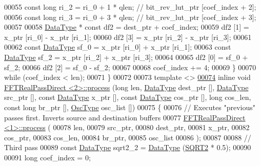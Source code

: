 \begin{DoxyCode}
00055         \textcolor{keyword}{const} \textcolor{keywordtype}{long}      ri\_2 = ri\_0 + 1 * qlen; \textcolor{comment}{// bit\_rev\_lut\_ptr [coef\_index + 2];}
00056         \textcolor{keyword}{const} \textcolor{keywordtype}{long}      ri\_3 = ri\_0 + 3 * qlen; \textcolor{comment}{// bit\_rev\_lut\_ptr [coef\_index + 3];}
00057 
00058         \hyperlink{a00013_a831663a8e0b1414e80f82cd3d18b5b6b}{DataType}    * \textcolor{keyword}{const} df2 = dest\_ptr + coef\_index;
00059         df2 [1] = x\_ptr [ri\_0] - x\_ptr [ri\_1];
00060         df2 [3] = x\_ptr [ri\_2] - x\_ptr [ri\_3];
00061 
00062         \textcolor{keyword}{const} \hyperlink{a00013_a831663a8e0b1414e80f82cd3d18b5b6b}{DataType}  sf\_0 = x\_ptr [ri\_0] + x\_ptr [ri\_1];
00063         \textcolor{keyword}{const} \hyperlink{a00013_a831663a8e0b1414e80f82cd3d18b5b6b}{DataType}  sf\_2 = x\_ptr [ri\_2] + x\_ptr [ri\_3];
00064 
00065         df2 [0] = sf\_0 + sf\_2;
00066         df2 [2] = sf\_0 - sf\_2;
00067 
00068         coef\_index += 4;
00069     \}
00070     \textcolor{keywordflow}{while} (coef\_index < len);
00071 \}
00072 
00073 \textcolor{keyword}{template} <>
\hypertarget{a00101_source_l00074}{}\hyperlink{a00013_af01edbd371e5ed87a67f0d63513ce1d7}{00074} \textcolor{keyword}{inline} \textcolor{keywordtype}{void} \hyperlink{a00013}{FFTRealPassDirect <2>::process} (\textcolor{keywordtype}{long} len, 
      \hyperlink{a00013_a831663a8e0b1414e80f82cd3d18b5b6b}{DataType} dest\_ptr [], \hyperlink{a00013_a831663a8e0b1414e80f82cd3d18b5b6b}{DataType} src\_ptr [], \textcolor{keyword}{const} \hyperlink{a00013_a831663a8e0b1414e80f82cd3d18b5b6b}{DataType} x\_ptr [], \textcolor{keyword}{const} 
      \hyperlink{a00013_a831663a8e0b1414e80f82cd3d18b5b6b}{DataType} cos\_ptr [], \textcolor{keywordtype}{long} cos\_len, \textcolor{keyword}{const} \textcolor{keywordtype}{long} br\_ptr [], \hyperlink{a00020}{OscType} osc\_list [])
00075 \{
00076     \textcolor{comment}{// Executes "previous" passes first. Inverts source and destination buffers}
00077     \hyperlink{a00013}{FFTRealPassDirect <1>::process} (
00078         len,
00079         src\_ptr,
00080         dest\_ptr,
00081         x\_ptr,
00082         cos\_ptr,
00083         cos\_len,
00084         br\_ptr,
00085         osc\_list
00086     );
00087 
00088     \textcolor{comment}{// Third pass}
00089     \textcolor{keyword}{const} \hyperlink{a00013_a831663a8e0b1414e80f82cd3d18b5b6b}{DataType}  sqrt2\_2 = \hyperlink{a00013_a831663a8e0b1414e80f82cd3d18b5b6b}{DataType} (\hyperlink{a00142_a489004390ad7d791bf53a724c0f07abb}{SQRT2} * 0.5);
00090 
00091     \textcolor{keywordtype}{long}                coef\_index = 0;

\end{DoxyCode}
